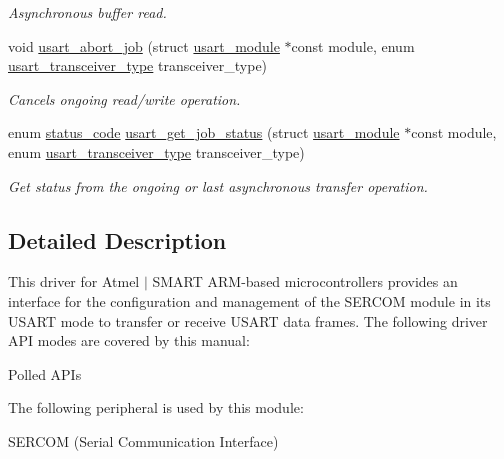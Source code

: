 \begin{DoxyCompactItemize}
\begin{DoxyCompactList}\small\item\em Asynchronous buffer read. \end{DoxyCompactList}\item 
void \mbox{\hyperlink{group__asfdoc__sam0__sercom__usart__group_ga08e77aeb7ff01d060c5c936a63581a99}{usart\+\_\+abort\+\_\+job}} (struct \mbox{\hyperlink{structusart__module}{usart\+\_\+module}} $\ast$const module, enum \mbox{\hyperlink{group__asfdoc__sam0__sercom__usart__group_gaab1b986bc581f76e99eec14ac37efe05}{usart\+\_\+transceiver\+\_\+type}} transceiver\+\_\+type)
\begin{DoxyCompactList}\small\item\em Cancels ongoing read/write operation. \end{DoxyCompactList}\item 
enum \mbox{\hyperlink{group__group__sam0__utils__status__codes_ga751c892e5a46b8e7d282085a5a5bf151}{status\+\_\+code}} \mbox{\hyperlink{group__asfdoc__sam0__sercom__usart__group_ga80364bc53d6d6405a2a7f3b1aa507503}{usart\+\_\+get\+\_\+job\+\_\+status}} (struct \mbox{\hyperlink{structusart__module}{usart\+\_\+module}} $\ast$const module, enum \mbox{\hyperlink{group__asfdoc__sam0__sercom__usart__group_gaab1b986bc581f76e99eec14ac37efe05}{usart\+\_\+transceiver\+\_\+type}} transceiver\+\_\+type)
\begin{DoxyCompactList}\small\item\em Get status from the ongoing or last asynchronous transfer operation. \end{DoxyCompactList}\end{DoxyCompactItemize}


\subsection{Detailed Description}
This driver for Atmel\textregistered{} $\vert$ S\+M\+A\+RT A\+RM\textregistered{}-\/based microcontrollers provides an interface for the configuration and management of the S\+E\+R\+C\+OM module in its U\+S\+A\+RT mode to transfer or receive U\+S\+A\+RT data frames. The following driver A\+PI modes are covered by this manual\+:


\begin{DoxyItemize}
\item Polled A\+P\+Is
\end{DoxyItemize}

The following peripheral is used by this module\+:
\begin{DoxyItemize}
\item S\+E\+R\+C\+OM (Serial Communication Interface)
\end{DoxyItemize}

